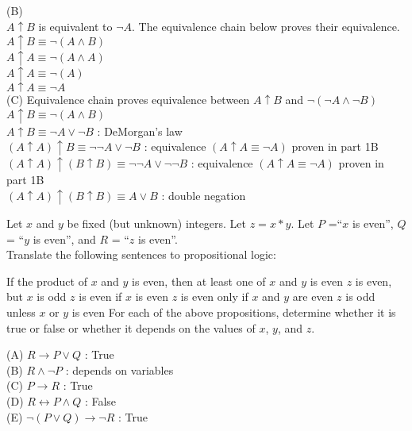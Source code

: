 \documentclass[solution,letterpaper]{cs20}
\begin{document}
\begin{problem}
\begin{solution}
    (B) \\
    $A \uparrow B$ is equivalent to $\neg A$. The equivalence chain below proves their equivalence. \\
    $A \uparrow B \equiv \neg(A \land B)$  \\
    $A \uparrow A \equiv \neg(A \land A)$ \\
    $A \uparrow A \equiv \neg(A)$ \\
    $A \uparrow A \equiv \neg A$ \\

    (C) Equivalence chain proves equivalence between $A \uparrow B$ and $\neg (\neg A \land \neg B)$\\
    $A \uparrow B \equiv \neg(A \land B)$ \\
    $A \uparrow B \equiv \neg A \lor \neg B$ :                                      DeMorgan's law \\
    $(A \uparrow A) \uparrow B \equiv \neg \neg A \lor \neg B$ :                    equivalence $(A \uparrow A \equiv \neg A)$ proven in part 1B \\
    $(A \uparrow A) \uparrow (B \uparrow B) \equiv \neg \neg A \lor \neg \neg B$ :  equivalence $(A \uparrow A \equiv \neg A)$ proven in part 1B \\
    $(A \uparrow A) \uparrow (B \uparrow B) \equiv A \lor B$ :                      double negation \\
\end{solution}
\end{problem}

\begin{problem}
Let $x$ and $y$ be fixed (but unknown) integers. Let $z = x * y$. Let $P$ =``$x$ is even'', $Q$ = ``$y$ is even'', and $R$ = ``$z$ is even''. \\

\noindent Translate the following sentences to propositional logic:

\subproblem If the product of $x$ and $y$ is even, then at least one of $x$ and $y$ is even
\subproblem $z$ is even, but $x$ is odd
\subproblem $z$ is even if $x$ is even
\subproblem $z$ is even only if $x$ and $y$ are even
\subproblem $z$ is odd unless $x$ or $y$ is even
\subproblem For each of the above propositions, determine whether it is true or false or whether it depends on the values of $x$, $y$, and $z$.

\begin{solution}
(A) $R \to P \lor Q$ : True\\
(B) $R \land \neg P$ : depends on variables\\
(C) $P \to R$ : True \\
(D) $R \leftrightarrow P \land Q$ : False\\
(E) $\neg (P \lor Q) \to \neg R$ : True\\
\end{solution}
\end{problem}
\pagebreak
\end{document}
